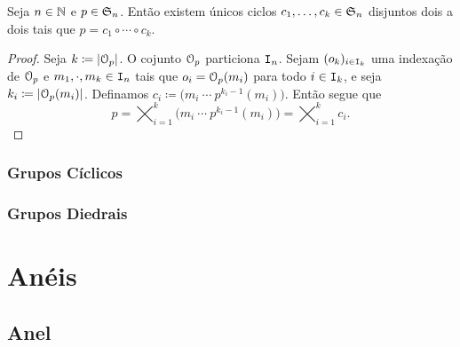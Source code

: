\begin{prop}
	Seja $n \in \mathbb{N}$ e $p \in \mathfrak{S}_n$. Então existem únicos ciclos $c_1,\ldots,c_k \in \mathfrak{S}_n$ disjuntos dois a dois tais que $p=c_1 \circ \cdots \circ c_k$.
\end{prop}
\begin{proof}
	Seja $k \coloneqq \card{\orb_p}$. O cojunto $\mathcal{O}_p$ particiona $\mathtt I_n$. Sejam $(o_k)_{i \in \mathtt I_k}$ uma indexação de $\mathcal{O}_p$ e $m_1,\cdot,m_k \in \mathtt I_n$ tais que $o_i=\mathcal{O}_p(m_i)$ para todo $i \in \mathtt I_k$, e seja $k_i \coloneqq \card{\orb_p(m_i)}$. Definamos $c_i \coloneqq  \bigl( m_i \ \cdots \  p^{k_i-1}(m_i)\bigr)$. Então segue que
	\begin{equation*}
	p = \bigtimes_{i=1}^k \bigl( m_i \ \cdots \  p^{k_i-1}(m_i)\bigr) = \bigtimes_{i=1}^k c_i.
	\end{equation*}
\end{proof}



\subsection{Grupos Cíclicos}

\subsection{Grupos Diedrais}



























\newpage

\chapter{Anéis}

\section{Anel}

